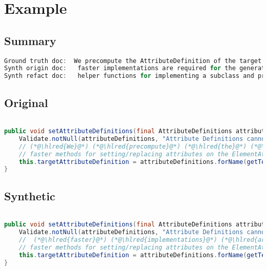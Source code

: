 \documentclass[11pt]{article}
\DeclareRobustCommand{\hlred}[1]{{\sethlcolor{YellowOrange}\hl{#1}}}
\begin{document}
  \pagebreak
  \section{Example}
  \subsection{Summary}

  \begin{lstlisting}[language=java]
Ground truth doc:  We precompute the AttributeDefinition of the target attribute in order to being able to use much
Synth origin doc:   faster implementations are required for the generation but cannot override or replace attributes instead of just
Synth refact doc:   helper functions for implementing a subclass and providing a lot to provide for simplicity and for
  \end{lstlisting}

  \subsection{Original}
  \begin{lstlisting}[language=java]

public void setAttributeDefinitions(final AttributeDefinitions attributeDefinitions) {
    Validate.notNull(attributeDefinitions, "Attribute Definitions cannot be null");
    // (*@\hlred{We}@*) (*@\hlred{precompute}@*) (*@\hlred{the}@*) (*@\hlred{AttributeDefinition}@*) (*@\hlred{of}@*) the (*@\hlred{target}@*) (*@\hlred{attribute}@*) (*@\hlred{in}@*) (*@\hlred{order}@*) (*@\hlred{to}@*) (*@\hlred{being}@*) (*@\hlred{able}@*) (*@\hlred{to}@*) (*@\hlred{use}@*) (*@\hlred{much}@*)
    // faster methods for setting/replacing attributes on the ElementAttributes implementation
    this.targetAttributeDefinition = attributeDefinitions.forName(getTemplateMode(), this.targetAttrCompleteName);
}
  \end{lstlisting}
  \subsection{Synthetic}

  \begin{lstlisting}[language=java]

public void setAttributeDefinitions(final AttributeDefinitions attributeDefinitions) {
    Validate.notNull(attributeDefinitions, "Attribute Definitions cannot be null");
    //  (*@\hlred{faster}@*) (*@\hlred{implementations}@*) (*@\hlred{are}@*) (*@\hlred{required}@*) (*@\hlred{for}@*) the (*@\hlred{generation}@*) (*@\hlred{but}@*) (*@\hlred{cannot}@*) (*@\hlred{override}@*) (*@\hlred{or}@*) (*@\hlred{replace}@*) (*@\hlred{attributes}@*) (*@\hlred{instead}@*) (*@\hlred{of}@*) (*@\hlred{just}@*)
    // faster methods for setting/replacing attributes on the ElementAttributes implementation
    this.targetAttributeDefinition = attributeDefinitions.forName(getTemplateMode(), this.targetAttrCompleteName);
}
  \end{lstlisting}
\end{document}
